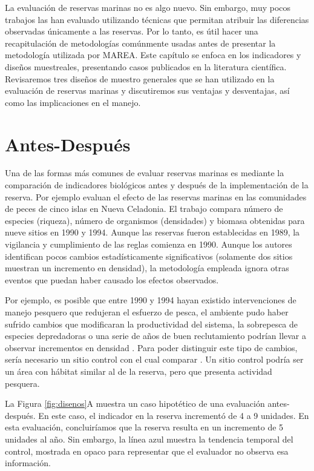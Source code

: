 \documentclass[]{krantz}
\begin{document}
La evaluación de reservas marinas no es algo nuevo. Sin embargo, muy pocos trabajos las han evaluado utilizando técnicas que permitan atribuir las diferencias observadas únicamente a las reservas. Por lo tanto, es útil hacer una recapitulación de metodologías comúnmente usadas antes de presentar la metodología utilizada por MAREA. Este capítulo se enfoca en los indicadores y diseños muestreales, presentando casos publicados en la literatura científica. Revisaremos tres diseños de muestro generales que se han utilizado en la evaluación de reservas marinas y discutiremos sus ventajas y desventajas, así como las implicaciones en el manejo.

\hypertarget{antes-despues}{%
\section{Antes-Después}\label{antes-despues}}

Una de las formas más comunes de evaluar reservas marinas es mediante la comparación de indicadores biológicos antes y después de la implementación de la reserva. Por ejemplo \citet{wantiez_1997} evaluan el efecto de las reservas marinas en las comunidades de peces de cinco islas en Nueva Celadonia. El trabajo compara número de especies (riqueza), número de organismos (densidades) y biomasa obtenidas para nueve sitios en 1990 y 1994. Aunque las reservas fueron establecidas en 1989, la vigilancia y cumplimiento de las reglas comienza en 1990. Aunque los autores identifican pocos cambios estadísticamente significativos (solamente dos sitios muestran un incremento en densidad), la metodología empleada ignora otras eventos que puedan haber causado los efectos observados.

Por ejemplo, es posible que entre 1990 y 1994 hayan existido intervenciones de manejo pesquero que redujeran el esfuerzo de pesca, el ambiente pudo haber sufrido cambios que modificaran la productividad del sistema, la sobrepesca de especies depredadoras o una serie de años de buen reclutamiento podrían llevar a observar incrementos en densidad \citep{szuwalski_2017, chavez_2003}. Para poder distinguir este tipo de cambios, sería necesario un sitio control con el cual comparar \citep{betti_2017}. Un sitio control podría ser un área con hábitat similar al de la reserva, pero que presenta actividad pesquera.

La Figura \ref{fig:disenos}A muestra un caso hipotético de una evaluación antes-después. En este caso, el indicador en la reserva incrementó de 4 a 9 unidades. En esta evaluación, concluiríamos que la reserva resulta en un incremento de 5 unidades al año. Sin embargo, la línea azul muestra la tendencia temporal del control, mostrada en opaco para representar que el evaluador no observa esa información.
\end{document}

